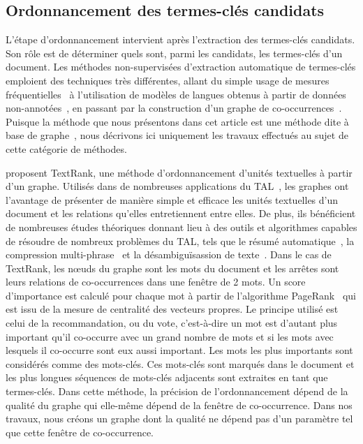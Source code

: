  \subsection{Ordonnancement des termes-clés candidats}
  \label{subsec:ordonnancement_des_termes_cles_candidats}
    L'étape d'ordonnancement intervient après l'extraction des termes-clés
    candidats. Son rôle est de déterminer quels sont, parmi les candidats, les
    termes-clés d'un document.
    Les méthodes non-supervisées d'extraction automatique de termes-clés
    emploient des techniques très différentes, allant du simple usage de mesures
    fréquentielles~\cite{jones1972tfidf,paukkeri2010likey} à l'utilisation de
    modèles de langues obtenus à partir de données
    non-annotées~\cite{tomokiyo2003languagemodel}, en passant par la
    construction d'un graphe de co-occurrences~\cite{mihalcea2004textrank}.
    Puisque la méthode que nous présentons dans cet article est une méthode dite
    \og à base de graphe~\fg, nous décrivons ici uniquement les travaux
    effectués au sujet de cette catégorie de méthodes.

     proposent TextRank, une méthode
    d'ordonnancement d'unités textuelles à partir d'un graphe. Utilisés dans de
    nombreuses applications du TAL~\cite{kozareva2013textgraphs}, les graphes
    ont l'avantage de présenter de manière simple et efficace les unités
    textuelles d'un document et les relations qu'elles entretiennent entre
    elles. De plus, ils bénéficient de nombreuses études théoriques donnant lieu
    à des outils et algorithmes capables de résoudre de nombreux problèmes du
    TAL, tels que le résumé automatique~\cite{wan2007iterativereinforcement}, la
    compression multi-phrase~\cite{boudin2013multisentencecompression} et la
    désambiguïsassion de texte~\cite{schwab2013desambiguisation}. Dans le cas de
    TextRank, les n\oe{}uds du graphe sont les mots du document et les arrêtes
    sont leurs relations de co-occurrences dans une fenêtre de 2 mots. Un score
    d'importance est calculé pour chaque mot à partir de l'algorithme 
    PageRank~\cite{brin1998pagerank} qui est issu de la mesure de centralité des
    vecteurs propres. Le principe utilisé est celui de la recommandation, ou du
    vote, c'est-à-dire un mot est d'autant plus important qu'il co-occurre avec
    un grand nombre de mots et si les mots avec lesquels il co-occurre sont eux
    aussi important. Les mots les plus importants sont considérés comme des
    mots-clés. Ces mots-clés sont marqués dans le document et les plus longues
    séquences de mots-clés adjacents sont extraites en tant que termes-clés.
    Dans cette méthode, la précision de l'ordonnancement dépend de la qualité du
    graphe qui elle-même dépend de la fenêtre de co-occurrence. Dans nos
    travaux, nous créons un graphe dont la qualité ne dépend pas d'un paramètre
    tel que cette fenêtre de co-occurrence.

